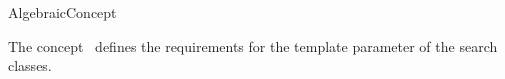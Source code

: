 \begin{ccRefConcept}{AlgebraicConcept}


\ccDefinition
  
The concept \ccClassTemplateName\ defines the requirements for the template 
parameter of the search classes.  

\ccTypes




\ccHasModels
{}\\


\end{ccRefConcept}